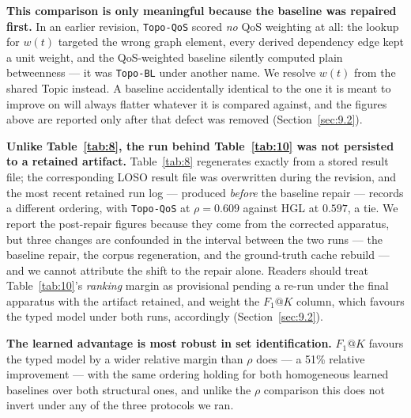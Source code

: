 \textbf{This comparison is only meaningful because the baseline was repaired first.} In an earlier
revision, \texttt{Topo-QoS} scored \emph{no} QoS weighting at all: the lookup for \(w(t)\) targeted
the wrong graph element, every derived dependency edge kept a unit weight, and the QoS-weighted
baseline silently computed plain betweenness --- it was \texttt{Topo-BL} under another name. We
resolve \(w(t)\) from the shared Topic instead. A baseline accidentally identical to the one it is
meant to improve on will always flatter whatever it is compared against, and the figures above are
reported only after that defect was removed (Section~\ref{sec:9.2}).

\textbf{Unlike Table~\ref{tab:8}, the run behind Table~\ref{tab:10} was not persisted to a retained
artifact.} Table~\ref{tab:8} regenerates exactly from a stored result file; the corresponding LOSO
result file was overwritten during the revision, and the most recent retained run log --- produced
\emph{before} the baseline repair --- records a different ordering, with \texttt{Topo-QoS} at
\(\rho=0.609\) against HGL at \(0.597\), a tie. We report the post-repair figures because they come
from the corrected apparatus, but three changes are confounded in the interval between the two runs
--- the baseline repair, the corpus regeneration, and the ground-truth cache rebuild --- and we
cannot attribute the shift to the repair alone. Readers should treat Table~\ref{tab:10}'s
\emph{ranking} margin as provisional pending a re-run under the final apparatus with the artifact
retained, and weight the \(F_1@K\) column, which favours the typed model under both runs, accordingly
(Section~\ref{sec:9.2}).

\textbf{The learned advantage is most robust in set identification.} \(F_1@K\) favours the typed
model by a wider relative margin than \(\rho\) does --- a 51\% relative improvement --- with the same
ordering holding for both homogeneous learned baselines over both structural ones, and unlike the
\(\rho\) comparison this does not invert under any of the three protocols we ran.


